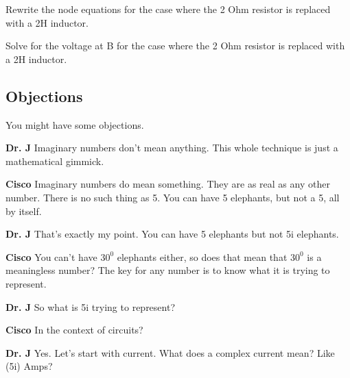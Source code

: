 \begin{blevel}
Rewrite the node equations for the case where the 2 Ohm resistor is replaced with a 2H inductor.
\end{blevel}

\begin{clevel}
Solve for the voltage at B for the case where the 2 Ohm resistor is replaced with a 2H inductor.
\end{clevel}

\subsection{Objections}
You might have some objections.\par
\vspace{6pt}
\setlength{\hangindent}{30pt}
\noindent \textbf{Dr. J}
Imaginary numbers don't mean anything. This whole technique is just a mathematical gimmick.\par
\vspace{6pt}
\setlength{\hangindent}{30pt} \noindent \textbf{Cisco}
Imaginary numbers do mean something. They are as real as any other number. There is no such thing as 5. You can have 5 elephants, but not a 5, all by itself.\par
\vspace{6pt}

\setlength{\hangindent}{30pt}\noindent \textbf{Dr. J}
That's exactly my point. You can have 5 elephants but not 5i elephants.\par
\vspace{6pt}

\setlength{\hangindent}{30pt}\noindent \textbf{Cisco}
You can't have $30^0$ elephants either, so does that mean that $30^0$ is a meaningless number? The key for any number is to know what it is trying to represent.\par
\vspace{6pt}

\setlength{\hangindent}{30pt}\noindent \textbf{Dr. J}
So what is 5i trying to represent?\par
\vspace{6pt}

\setlength{\hangindent}{30pt}\noindent \textbf{Cisco}
In the context of circuits?\par
\vspace{6pt}

\setlength{\hangindent}{30pt}\noindent \textbf{Dr. J}
Yes. Let's start with current. What does a complex current mean? Like (5i) Amps?\par
\vspace{6pt}

